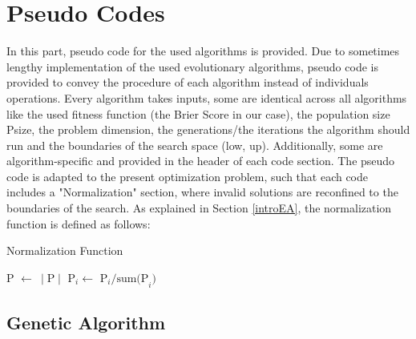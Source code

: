 \section{Pseudo Codes}
\label{append}
In this part, pseudo code for the used algorithms is provided. Due to sometimes lengthy implementation of the used evolutionary algorithms, pseudo code is provided to convey the procedure of each algorithm instead of individuals operations. Every algorithm takes inputs, some are identical across all algorithms like the used fitness function (the Brier Score in our case), the population size Psize, the problem dimension, the generations/the iterations the algorithm should run and the boundaries of the search space (low, up). Additionally, some are algorithm-specific and provided in the header of each code section. The pseudo code is adapted to the present optimization problem, such that each code includes a "Normalization" section, where invalid solutions are reconfined to the boundaries of the search. As explained in Section \ref{introEA}, the normalization function is defined as follows:

\begin{algorithm}
\singlespacing
\caption{Normalization Function} \label{NORM}
\begin{algorithmic}[1]
	\State P $\gets \: \mid \text{P} \mid$    
		\State P$_i \gets$ P$_i / \text{sum(P}_i)$ 
	\EndFor	
	\EndFunction
\end{algorithmic}
\end{algorithm}

\newpage
\subsection{Genetic Algorithm}

